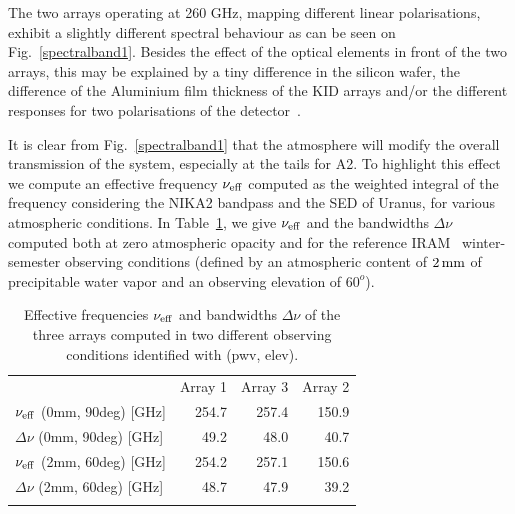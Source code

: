 The two arrays operating at 260 GHz, mapping different linear polarisations,
exhibit a slightly different spectral behaviour as can be
seen on Fig.~\ref{spectralband1}. {\lp Besides the effect of the
optical elements in front of the two arrays, this may be explained by
a tiny difference in the silicon wafer, the difference of the
Aluminium film thickness of the KID arrays and/or the different
responses for two polarisations of the
detector~\citep{Adam2018, Shu2018_bandpass}.}

It is clear from Fig.~\ref{spectralband1} that the atmosphere will
modify the overall transmission of the system, especially at the tails
for A2. {\lp To highlight this effect we compute an effective
frequency $\nu_{\rm{eff}}$ computed as the weighted integral of the
frequency considering the NIKA2 bandpass and the SED of Uranus, for
various atmospheric conditions.}
In Table~\ref{tab:frequencies}, we give $\nu_{\rm{eff}}$ and the
bandwidths $\Delta \nu$ computed both at zero atmospheric opacity and for the
reference IRAM \trentemetre\ winter-semester observing conditions
(defined by an atmospheric content of $2\,\rm{mm}$ of precipitable
water vapor and an observing elevation of $60^o$).

\begin{table}[!htbp]
  \caption[]{Effective frequencies $\nu_{\rm{eff}}$ and bandwidths
    $\Delta \nu$
    of the three arrays computed in two different observing conditions
    identified with (pwv, elev).}
  \label{tab:frequencies}
  \centering    
  \begin{tabular}{lrrr}
    \hline\hline
    \noalign{\smallskip}
    & Array 1 & Array 3 & Array 2 \\
    \noalign{\smallskip}
    \hline
    \noalign{\smallskip}
    $\nu_{\rm{eff}}$ \small{(0mm, 90deg)} [GHz] & 254.7 & 257.4 &  150.9 \\
    $\Delta \nu$ \small{(0mm, 90deg)} [GHz] &  49.2 & 48.0  &   40.7 \\
    $\nu_{\rm{eff}}$ \small{(2mm, 60deg)} [GHz] & 254.2 & 257.1 &  150.6 \\
    $\Delta \nu$ \small{(2mm, 60deg)} [GHz] &  48.7 &  47.9 &    39.2 \\
    \noalign{\smallskip}
    \hline
  \end{tabular}
\end{table}

